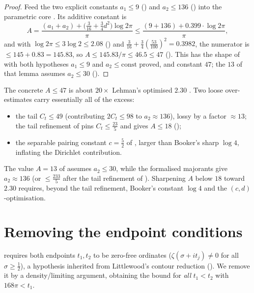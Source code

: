 \begin{proof}
\leanok
Feed the two explicit constants $a_1\le9$
() and $a_2\le136$
() into the parametric core
. Its additive constant is
\[
  A=\frac{(a_1+a_2)+\bigl(\tfrac3{16}+\tfrac34 d^2\bigr)\log2\pi}{\pi}
   \le\frac{(9+136)+0.399\cdot\log2\pi}{\pi},
\]
and with $\log2\pi\le3\log2\le2.08$ () and
$\tfrac3{16}+\tfrac34(\tfrac{53}{100})^2=0.3982$, the numerator is $\le145+0.83=145.83$,
so $A\le145.83/\pi\le46.5\le 47$ (). This has the shape of
 with both hypotheses $a_1\le9$ and
$a_2\le\text{const}$ proved, and constant $47$; the $13$ of that lemma assumes $a_2\le30$
().
\end{proof}

\begin{remark}
\label{rem:le_A_value}
The concrete $A\le47$ is about $20\times$ Lehman's optimised $2.30$ \cite{Lehman1970}. Two
loose over-estimates carry essentially all of the excess:
\begin{itemize}
  \item the tail $C_t\le49$ (contributing $2C_t\le98$ to $a_2\approx136$), lossy by a
        factor $\approx13$; the tail refinement of  pins
        $C_t\le\tfrac{23}5$ and gives $A\le18$ ();
  \item the separable pairing constant $c=\tfrac52$ of , larger than
        Booker's sharp $\log4$, inflating the Dirichlet contribution.
\end{itemize}
The value $A=13$ of  assumes $a_2\le30$, while
the formalised majorants give $a_2\approx136$ (or $\le\tfrac{233}5$ after the tail
refinement of ). Sharpening $A$ below $18$ toward $2.30$ requires,
beyond the tail refinement, Booker's constant $\log4$ and the $(c,d)$-optimisation.
\end{remark}

\section{Removing the endpoint conditions}
\label{sec:le_endpoints}

 requires both endpoints $t_1,t_2$ to be zero-free ordinates
($\zeta(\sigma+it_j)\neq0$ for all $\sigma\ge\tfrac12$), a hypothesis inherited from
Littlewood's contour reduction (). We
remove it by a density/limiting argument, obtaining the bound for \emph{all} $t_1<t_2$ with
$168\pi<t_1$.

